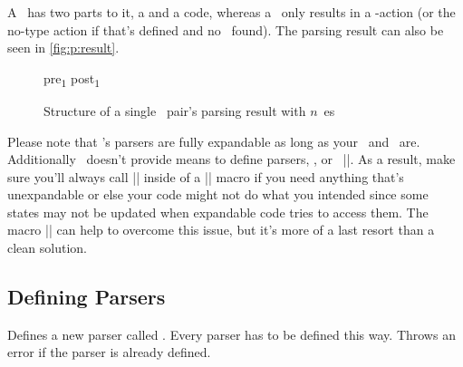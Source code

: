 A \prefix\ has two parts to it, a  and a  code, whereas a
\type\ only results in a \type-action (or the no-type action if that's defined
and no \type\ found). The parsing result can also be seen in
\autoref{fig:p:result}.

\begin{figure}[b]
  \centering
  \def\plevel#1{\raisebox{1ex}{#1}}%
  \def\ts#1{\textsubscript{$#1$}}%
  \begingroup
    \ttfamily
    pre\ts1
    \plevel
      {%
        pre\ts2
        \plevel
          {%
            \ldots\space
            \plevel
              {%
                pre\ts n
                \plevel{\type-action}
                post\ts n
              }%
            \ldots\space
          }%
        post\ts2
      }%
    post\ts{1}%
  \endgroup
  \caption
    {%
      Structure of a single \kv\ pair's parsing result with $n$~\prefix{}es%
      \label{fig:p:result}%
    }
\end{figure}

Please note that \expkvp's parsers are fully expandable as long as your
\prefixes\ and \types\ are. Additionally \expkvp\ doesn't provide means to
define parsers, \prefixes, or \types\ |\protected|. As a result, make sure
you'll always call |\ekvpParse| inside of a |\protected| macro if you need
anything that's unexpandable or else your code might not do what you intended
since some states may not be updated when expandable code tries to access them.
The macro |\ekvpProtect| can help to overcome this issue, but it's more of a
last resort than a clean solution.

\subsection{Defining Parsers}

\begin{function}{\ekvpNewParser}
  \begin{syntax}
  \end{syntax}
  Defines a new parser called . Every parser has to be defined this
  way. Throws an error if the parser is already defined.
\end{function}


